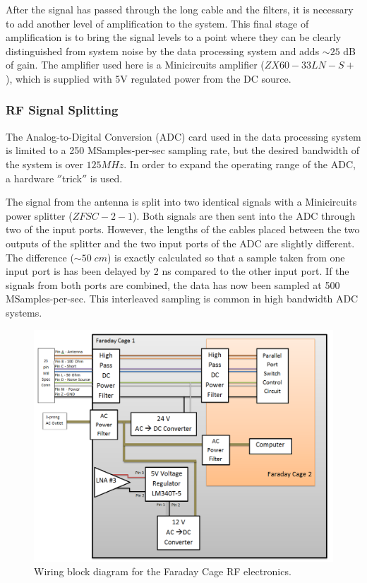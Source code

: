 After the signal has passed through the long cable and the filters, it is necessary to add another level of amplification to the system. This final stage of amplification is to bring the signal levels to a point where they can be clearly distinguished from system noise by the data processing system and adds $\sim25$ dB of gain. The amplifier used here is a Minicircuits amplifier ($ZX60-33LN-S+$), which is supplied with 5V regulated power from the DC source. 

\subsubsection{RF Signal Splitting} \label{Sec:hard_split}

The Analog-to-Digital Conversion (ADC) card used in the data processing system is limited to a 250 MSamples-per-sec sampling rate, but the desired bandwidth of the system is over $125 MHz$. In order to expand the operating range of the ADC, a hardware $''$trick$''$ is used.

The signal from the antenna is split into two identical signals with a Minicircuits power splitter ($ZFSC-2-1$). Both signals are then sent into the ADC through two of the input ports. However, the lengths of the cables placed between the two outputs of the splitter and the two input ports of the ADC are slightly different. The difference ($\sim 50 \; cm$) is exactly calculated so that a sample taken from one input port is has been delayed by 2 ns compared to the other input port. If the signals from both ports are combined, the data has now been sampled at 500 MSamples-per-sec. This interleaved sampling is common in high bandwidth ADC systems. 

\begin{figure}[htb]
\begin{center}
\includegraphics[width=0.9\linewidth]{SCIHI_system/figures/fcage_rf_power_block_diagram.png}
\caption{Wiring block diagram for the Faraday Cage RF electronics.}
\label{Fig:fcage_RF_pow_block_diagram}
\end{center}
\end{figure}

